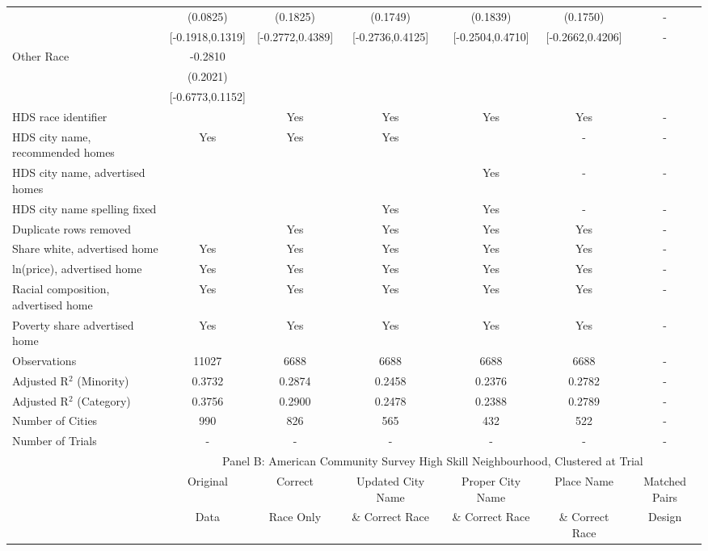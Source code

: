 \begin{table}[htbp]
{\begin{tabular}{l*{6}{c}}
 & (0.0825) & (0.1825) & (0.1749) & (0.1839) & (0.1750) & - \\
 & [-0.1918,0.1319] & [-0.2772,0.4389] & [-0.2736,0.4125] & [-0.2504,0.4710] & [-0.2662,0.4206] & - \\
Other Race & -0.2810 &  &  &  &  &  \\
 & (0.2021) &  &  &  &  &  \\
 & [-0.6773,0.1152] &  &  &  &  &  \\
\midrule
HDS race identifier & & Yes & Yes & Yes & Yes & - \\
HDS city name, recommended homes & Yes & Yes & Yes & & - & -\\
HDS city name, advertised homes &  &  &  & Yes & - & -\\
HDS city name spelling fixed & & & Yes & Yes & - & -\\
Duplicate rows removed &  & Yes & Yes & Yes & Yes & - \\
\midrule
Share white, advertised home  & Yes & Yes & Yes & Yes & Yes & - \\
ln(price), advertised home  & Yes & Yes & Yes & Yes & Yes & - \\
Racial composition, advertised home & Yes & Yes & Yes & Yes & Yes & - \\
Poverty share advertised home & Yes & Yes & Yes & Yes & Yes & - \\
Observations & 11027 & 6688 & 6688 & 6688 & 6688 & - \\
Adjusted R$^2$ (Minority) & 0.3732 & 0.2874 & 0.2458 & 0.2376 & 0.2782 & - \\
Adjusted R$^2$ (Category) & 0.3756 & 0.2900 & 0.2478 & 0.2388 & 0.2789 & - \\
Number of Cities & 990 & 826 & 565 & 432 & 522 & - \\
Number of Trials & - & - & - & - & - & - \\
\bottomrule
\toprule
& \multicolumn{6}{c}{Panel B: American Community Survey High Skill Neighbourhood, Clustered at Trial}\\
\toprule
                    &\multicolumn{1}{c}{Original}&\multicolumn{1}{c}{Correct}&\multicolumn{1}{c}{Updated City Name}&\multicolumn{1}{c}{Proper City Name}&\multicolumn{1}{c}{Place Name}&\multicolumn{1}{c}{Matched Pairs}\\
                      &\multicolumn{1}{c}{Data}&\multicolumn{1}{c}{Race Only}&\multicolumn{1}{c}{\& Correct Race}&\multicolumn{1}{c}{\& Correct Race}&\multicolumn{1}{c}{\& Correct Race}&\multicolumn{1}{c}{Design}\\                  

\end{tabular}}
\end{table}
